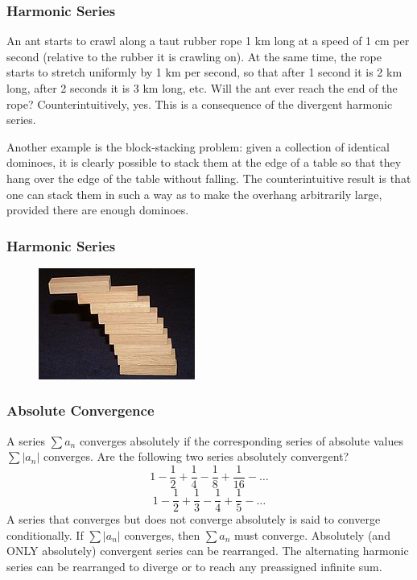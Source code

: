 \documentclass[xcolor=dvipsnames]{beamer}
\begin{document}
\begin{frame}
  \frametitle{Harmonic Series}
  An ant starts to crawl along a taut rubber rope 1 km long at a
  speed of 1 cm per second (relative to the rubber it is crawling
  on). At the same time, the rope starts to stretch uniformly by 1
  km per second, so that after 1 second it is 2 km long, after 2
  seconds it is 3 km long, etc. Will the ant ever reach the end of
  the rope? Counterintuitively, yes. This is a consequence of the
  divergent harmonic series.

  \bigskip

  Another example is the block-stacking problem: given a
  collection of identical dominoes, it is clearly possible to
  stack them at the edge of a table so that they hang over the
  edge of the table without falling. The counterintuitive result
  is that one can stack them in such a way as to make the overhang
  arbitrarily large, provided there are enough dominoes.
\end{frame}

\begin{frame}
  \frametitle{Harmonic Series}
  \begin{figure}[h]
    \includegraphics[scale=.02]{./diagrams/harm1.jpg}
  \end{figure}
\end{frame}

\begin{frame}
  \frametitle{Absolute Convergence}
  A series $\sum{}a_{n}$ \alert{converges absolutely} if the
  corresponding series of absolute values $\sum\vert{}a_{n}\vert$
  converges. Are the following two series absolutely convergent?
  \begin{equation}
    \label{eq:pheequie}
    1-\frac{1}{2}+\frac{1}{4}-\frac{1}{8}+\frac{1}{16}-{\ldots}
  \end{equation}
  \begin{equation}
    \label{eq:uaqueigh}
    1-\frac{1}{2}+\frac{1}{3}-\frac{1}{4}+\frac{1}{5}-{\ldots}
  \end{equation}
A series that converges but does not converge absolutely is said
to \alert{converge conditionally}. If $\sum\vert{}a_{n}\vert$
converges, then $\sum{}a_{n}$ must converge. Absolutely (and ONLY
absolutely) convergent series can be rearranged. The alternating
harmonic series can be rearranged to diverge or to reach any
preassigned infinite sum.
\end{frame}
\end{document}

